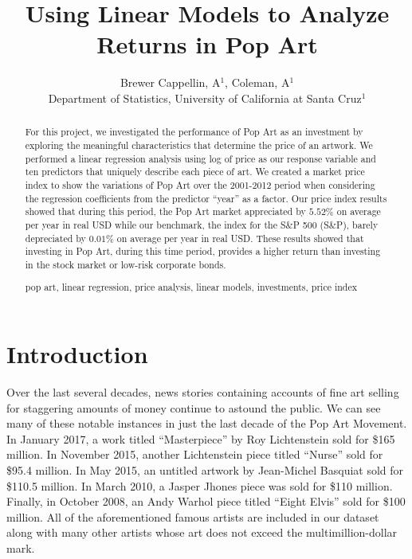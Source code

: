 \documentclass[]{asaproc}\usepackage[]{graphicx}\usepackage[]{color}
\title{Using Linear Models to Analyze Returns in Pop Art}
\author{Brewer Cappellin, A$^1$, Coleman, A$^1$\\
Department of Statistics, University of California at Santa Cruz$^1$\\}
\begin{document}

\maketitle



















\begin{abstract}
For this project, we investigated the performance of Pop Art as an investment by exploring the meaningful characteristics that determine the price of an artwork. We performed a linear regression analysis using log of price as our response variable and ten predictors that uniquely describe each piece of art. We created a market price index to show the variations of Pop Art over the 2001-2012 period when considering the regression coefficients from the predictor ``year'' as a factor. Our price index results showed that during this period, the Pop Art market appreciated by $5.52$\% on average per year in real USD while our benchmark, the index for the S\&P 500 (S\&P), barely depreciated by $0.01$\% on average per year in real USD. These results showed that investing in Pop Art, during this time period, provides a higher return than investing in the stock market or low-risk corporate bonds.
\begin{keywords}
pop art, linear regression, price analysis, linear models, investments, price index
\end{keywords}
\end{abstract}

\section{Introduction}

Over the last several decades, news stories containing accounts of fine art selling for staggering amounts of money continue to astound the public. We can see many of these notable instances in just the last decade of the Pop Art Movement. In January 2017, a work titled ``Masterpiece'' by Roy Lichtenstein sold for \$165 million. In November 2015, another Lichtenstein piece titled ``Nurse'' sold for \$95.4 million. In May 2015, an untitled artwork by Jean-Michel Basquiat sold for  \$110.5 million. In March 2010, a Jasper Jhones piece was sold for \$110 million. Finally, in October 2008, an Andy Warhol piece titled ``Eight Elvis'' sold for \$100 million. All of the aforementioned famous artists are included in our dataset along with many other artists whose art does not exceed the multimillion-dollar mark.
\end{document}
